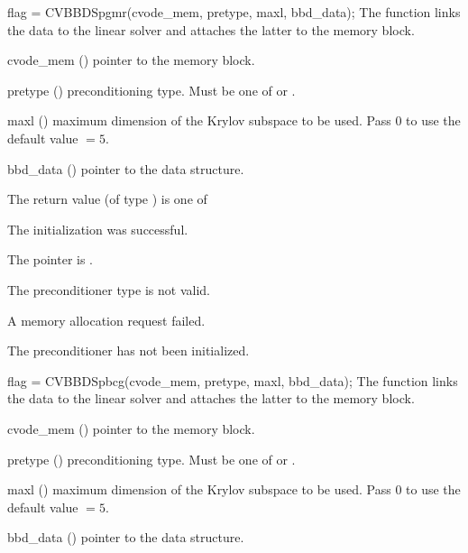 {
  flag = CVBBDSpgmr(cvode\_mem, pretype, maxl, bbd\_data);
}
{
  The function  links the {\cvbbdpre} data to the
  {\cvspgmr} linear solver and attaches the latter to the {\cvode}
  memory block.
}
{
  \begin{args}
  \item[cvode\_mem] ()
    pointer to the {\cvode} memory block.
  \item[pretype] ()
    preconditioning type. Must be one of  or .
  \item[maxl] ()
    maximum dimension of the Krylov subspace to be used. Pass $0$ to use the 
    default value  $= 5$.
  \item[bbd\_data] ()
    pointer to the {\cvbbdpre} data structure.
  \end{args}
}
{
  The return value  (of type ) is one of
  \begin{args}
  \item[\Id{CVSPILS\_SUCCESS}] 
    The {\cvspgmr} initialization was successful.
  \item[\Id{CVSPILS\_MEM\_NULL}]
    The  pointer is .
  \item[\Id{CVSPILS\_ILL\_INPUT}]
    The preconditioner type  is not valid.
  \item[\Id{CVSPILS\_MEM\_FAIL}]
    A memory allocation request failed.
  \item[\Id{CVBBDPRE\_PDATA\_NULL}]
    The {\cvbbdpre} preconditioner has not been initialized.
  \end{args}
}
{}
{
  flag = CVBBDSpbcg(cvode\_mem, pretype, maxl, bbd\_data);
}
{
  The function  links the {\cvbbdpre} data to the
  {\cvspbcg} linear solver and attaches the latter to the {\cvode}
  memory block.
}
{
  \begin{args}
  \item[cvode\_mem] ()
    pointer to the {\cvode} memory block.
  \item[pretype] ()
    preconditioning type. Must be one of  or .
  \item[maxl] ()
    maximum dimension of the Krylov subspace to be used. Pass $0$ to use the 
    default value  $= 5$.
  \item[bbd\_data] ()
    pointer to the {\cvbbdpre} data structure.
  \end{args}
}
